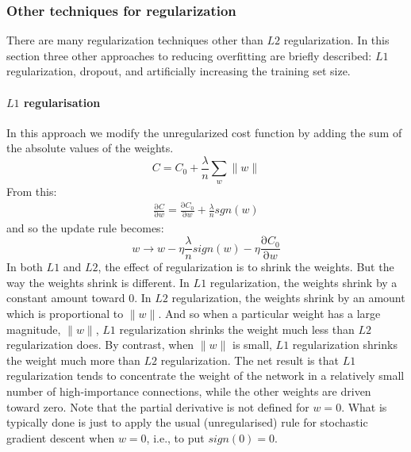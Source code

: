 \documentclass[12pt, letterpaper]{article}
\theoremstyle{definition}
\newcommand{\pr}{\mathrm{\partial}}
\let\tb\textbf
\begin{document}
\subsubsection{Other techniques for regularization}
There are many regularization techniques other than $L2$ regularization. In this section three other approaches to reducing overfitting are briefly described: $L1$ regularization, dropout, and artificially increasing the training set size. 

\paragraph{\tb{$L1$ regularisation}}In this approach we modify the unregularized cost function by adding the sum of the absolute values of the weights.
\begin{equation}
C =C_0 + \frac{\lambda}{n}\sum_w \|w\|
\end{equation}
From this:
\begin{equation}
\begin{aligned}
\frac{\pr C}{\pr w} = \frac{\pr C_0}{\pr w} + \frac{\lambda}{n} sgn(w) 
\end{aligned}
\end{equation}
and so the update rule becomes:
\begin{equation}
w\rightarrow w-\eta \frac{\lambda}{n} sign(w) -\eta \frac{\pr C_0}{\pr w} 
\end{equation}
In both $L1$ and $L2$, the effect of regularization is to shrink the weights. But the way the weights shrink is different. In $L1$ regularization, the weights shrink by a constant amount toward $0$. In $L2$ regularization, the weights shrink by an amount which is proportional to $\|w\|$. And so when a particular weight has a large magnitude, $\|w\|$, $L1$ regularization shrinks the weight much less than $L2$ regularization does. By contrast, when $\|w\|$ is small, $L1$ regularization shrinks the weight much more than $L2$ regularization. The net result is that $L1$ regularization tends to concentrate the weight of the network in a relatively small number of high-importance connections, while the other weights are driven toward zero. Note that the partial derivative is not defined for $w=0$. What is typically done is just to apply the usual (unregularised) rule for stochastic gradient descent when $w=0$, i.e., to put $sign(0)=0$.
\end{document}
